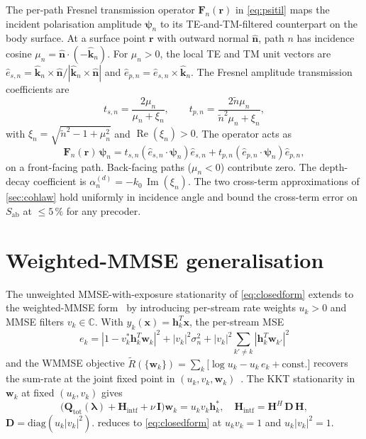 \documentclass[journal,twocolumn,10pt]{IEEEtran}
\theoremstyle{plain}
\theoremstyle{remark}
\newcommand{\khat}{\hat{\bm{k}}}
\newcommand{\nhat}{\hat{\bm{n}}}
\newcommand{\rr}{\mathbf{r}}
\newcommand{\xx}{\mathbf{x}}
\newcommand{\hh}{\mathbf{h}}
\newcommand{\ww}{\mathbf{w}}
\newcommand{\Sab}{S_{\mathrm{ab}}}
\newcommand{\Qmat}{\mathbf{Q}}
\newcommand{\Hintf}{\mathbf{H}_{\mathrm{intf}}}
\newcommand{\Fn}{\mathbf{F}_n}
\newcommand{\psin}{\bm{\psi}_n}
\newcommand{\Complex}{\mathbb{C}}
\newcommand{\ntilde}{\tilde{n}}
\DeclareMathOperator{\RE}{Re}
\DeclareMathOperator{\IM}{Im}
\begin{document}
The per-path Fresnel transmission operator $\Fn(\rr)$ in
\cref{eq:psitil} maps the incident polarisation amplitude $\psin$
to its TE-and-TM-filtered counterpart on the body surface. At a
surface point $\rr$ with outward normal $\nhat$, path $n$ has
incidence cosine $\mu_n = \nhat \cdot (-\khat_n)$. For $\mu_n > 0$,
the local TE and TM unit vectors are
$\hat{e}_{s,n} = \khat_n \times \nhat / |\khat_n \times \nhat|$ and
$\hat{e}_{p,n} = \hat{e}_{s,n} \times \khat_n$. The Fresnel
amplitude transmission coefficients are
\begin{equation}\label{eq:t-coef-app}
  t_{s,n} = \frac{2 \mu_n}{\mu_n + \xi_n},
  \qquad
  t_{p,n} = \frac{2 \ntilde \mu_n}{\ntilde^2 \mu_n + \xi_n},
\end{equation}
with $\xi_n = \sqrt{\ntilde^2 - 1 + \mu_n^2}$ and
$\RE(\xi_n) > 0$. The operator acts as
\begin{equation}\label{eq:F-action}
  \Fn(\rr)\,\psin = t_{s,n}(\hat{e}_{s,n} \cdot \psin)
  \hat{e}_{s,n} + t_{p,n}(\hat{e}_{p,n} \cdot \psin) \hat{e}_{p,n},
\end{equation}
on a front-facing path. Back-facing paths ($\mu_n < 0$) contribute
zero. The depth-decay coefficient is
$\alpha_n^{(d)} = -k_0\,\IM(\xi_n)$. The two cross-term
approximations of \cref{sec:cohlaw} hold uniformly in incidence
angle and bound the cross-term error on $\Sab$ at $\leq 5\,\%$ for
any precoder.


\section{Weighted-MMSE generalisation}\label{app:wmmse}

The unweighted MMSE-with-exposure stationarity of
\cref{eq:closedform} extends to the weighted-MMSE
form~\cite{Christensen2008,Shi2011} by introducing per-stream rate
weights $u_k > 0$ and MMSE filters $v_k \in \Complex$. With
$y_k(\xx) = \hh_k^T \xx$, the per-stream MSE
\begin{equation}\label{eq:wmmse-mse}
  e_k = |1 - v_k^* \hh_k^T \ww_k|^2 + |v_k|^2 \sigma_n^2 +
  |v_k|^2 \sum_{k' \neq k} |\hh_k^T \ww_{k'}|^2
\end{equation}
and the WMMSE objective
$\tilde R(\{\ww_k\}) = \sum_k\bigl[\log u_k - u_k\,e_k +
\mathrm{const.}\bigr]$ recovers the sum-rate at the joint
fixed point in $(u_k, v_k, \ww_k)$~\cite{Christensen2008}. The
KKT stationarity in $\ww_k$ at fixed $(u_k, v_k)$ gives
\begin{equation}\label{eq:KKT-wmmse}
  \bigl(\Qmat_{\mathrm{tot}}(\bm\lambda) + \Hintf + \nu\,
  \mathbf{I}\bigr) \ww_k = u_k v_k \hh_k^*,
  \quad
  \Hintf = \mathbf{H}^H\,\mathbf{D}\,\mathbf{H},
\end{equation}
$\mathbf{D} = \mathrm{diag}(u_k|v_k|^2)$. 
reduces to \cref{eq:closedform} at $u_k v_k = 1$ and $u_k|v_k|^2 = 1$.
\end{document}
